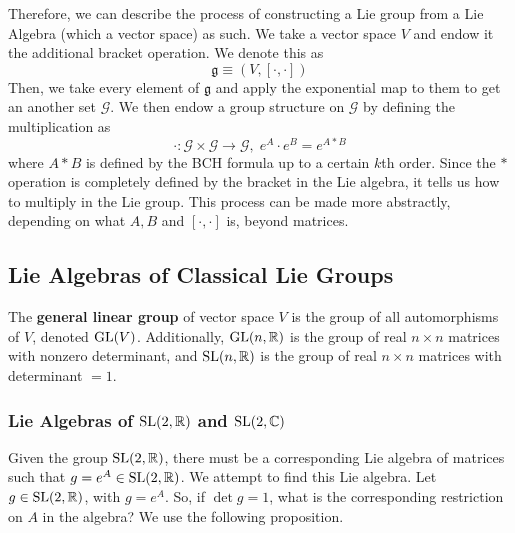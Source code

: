   Therefore, we can describe the process of constructing a Lie group from a Lie Algebra (which a vector space) as such. We take a vector space $V$ and endow it the additional bracket operation. We denote this as
  \begin{equation}
    \mathfrak{g} \equiv (V, [\cdot, \cdot])
  \end{equation}
  Then, we take every element of $\mathfrak{g}$ and apply the exponential map to them to get an another set $\mathcal{G}$. We then endow a group structure on $\mathcal{G}$ by defining the multiplication as 
  \begin{equation}
    \cdot: \mathcal{G} \times \mathcal{G} \longrightarrow \mathcal{G}, \; e^A \cdot e^B = e^{A * B}
  \end{equation}
  where $A*B$ is defined by the BCH formula up to a certain $k$th order. Since the $*$ operation is completely defined by the bracket in the Lie algebra, it tells us how to multiply in the Lie group. This process can be made more abstractly, depending on what $A, B$ and $[\cdot,\cdot]$ is, beyond matrices. 

\subsection{Lie Algebras of Classical Lie Groups}

  \begin{definition}
    The \textbf{general linear group} of vector space $V$ is the group of all automorphisms of $V$, denoted $\operatorname{GL}(V)$. Additionally, $\operatorname{GL}(n, \mathbb{R})$ is the group of real $n \times n$ matrices with nonzero determinant, and $\operatorname{SL}(n, \mathbb{R})$ is the group of real $n \times n$ matrices with determinant $= 1$.
  \end{definition}

  \subsubsection[Lie Algebras of SL(2, R) and SL(2, C)]{Lie Algebras of $\operatorname{SL}(2, \mathbb{R})$ and $\operatorname{SL}(2, \mathbb{C})$}

    Given the group $\operatorname{SL}(2, \mathbb{R})$, there must be a corresponding Lie algebra of matrices such that $g = e^A \in \operatorname{SL}(2, \mathbb{R})$. We attempt to find this Lie algebra. Let $g \in \operatorname{SL}(2, \mathbb{R})$, with $g = e^A$. So, if $\det{g} = 1$, what is the corresponding restriction on $A$ in the algebra? We use the following proposition. 

